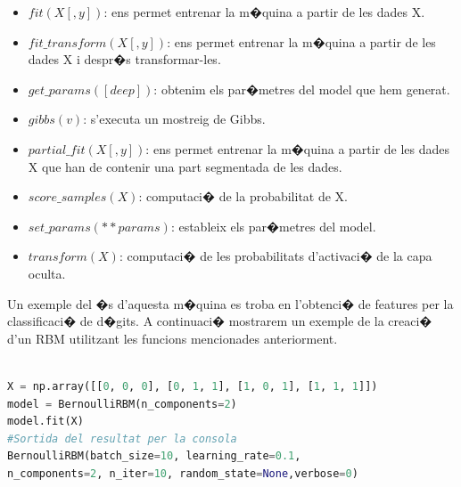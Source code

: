 \documentclass[12pt,a4paper,openright,oneside]{article}
\numberwithin{equation}{section}
\theoremstyle{definition}
\begin{document}
\begin{itemize}
\item ${fit (X[,y])}$: ens permet entrenar la m�quina a partir de les dades X.
\item ${fit\_transform (X[,y])}$: ens permet entrenar la m�quina a partir de les dades X i despr�s transformar-les.
\item ${get\_params([deep])}$: obtenim els par�metres del model que hem generat.
\item ${gibbs(v)}$: s'executa un mostreig de Gibbs.
\item ${partial\_fit(X[,y])}$: ens permet entrenar la m�quina a partir de les dades X que han de contenir una part segmentada de les dades.
\item ${score\_samples(X)}$: computaci� de la probabilitat de X.
\item ${set\_params(**params)}$: estableix els par�metres del model.
\item ${transform(X)}$: computaci� de les probabilitats d'activaci� de la capa oculta.
\end{itemize}
Un exemple del �s d'aquesta m�quina es troba en l'obtenci� de features per la classificaci� de d�gits. A continuaci� mostrarem un exemple de la creaci� d'un RBM utilitzant les funcions mencionades anteriorment.\\\
\begin{lstlisting}[language=Python,basicstyle=\footnotesize\ttfamily]
X = np.array([[0, 0, 0], [0, 1, 1], [1, 0, 1], [1, 1, 1]])
model = BernoulliRBM(n_components=2)
model.fit(X)
#Sortida del resultat per la consola
BernoulliRBM(batch_size=10, learning_rate=0.1, 
n_components=2, n_iter=10, random_state=None,verbose=0)
\end{lstlisting}
\end{document}
